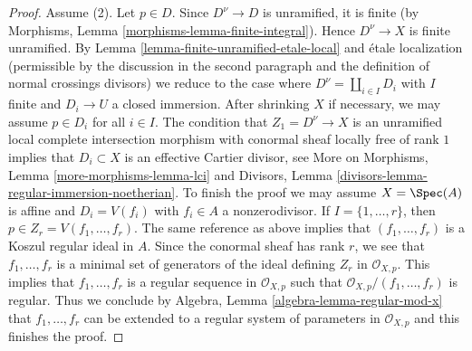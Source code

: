 \begin{proof}
\medskip\noindent
Assume (2). Let $p \in D$. Since $D^\nu \to D$ is unramified, it is
finite (by Morphisms, Lemma \ref{morphisms-lemma-finite-integral}).
Hence $D^\nu \to X$ is finite unramified.
By Lemma \ref{lemma-finite-unramified-etale-local}
and \'etale localization (permissible by the discussion
in the second paragraph and the definition of normal
crossings divisors) we reduce to the case where
$D^\nu = \coprod_{i \in I} D_i$
with $I$ finite and $D_i \to U$ a closed immersion.
After shrinking $X$ if necessary, we may assume
$p \in D_i$ for all $i \in I$. The condition that $Z_1 =  D^\nu \to X$ is an
unramified local complete intersection morphism
with conormal sheaf locally free of rank $1$
implies that $D_i \subset X$ is an effective Cartier divisor, see
More on Morphisms, Lemma \ref{more-morphisms-lemma-lci} and
Divisors, Lemma \ref{divisors-lemma-regular-immersion-noetherian}.
To finish the proof we may assume $X = \Spec(A)$ is affine
and $D_i = V(f_i)$ with $f_i \in A$ a nonzerodivisor.
If $I = \{1, \ldots, r\}$, then $p \in Z_r = V(f_1, \ldots, f_r)$.
The same reference as above implies that
$(f_1, \ldots, f_r)$ is a Koszul regular ideal in $A$.
Since the conormal sheaf has rank $r$, we see that
$f_1, \ldots, f_r$ is a minimal set of generators of
the ideal defining $Z_r$ in $\mathcal{O}_{X, p}$.
This implies that $f_1, \ldots, f_r$ is a regular sequence
in $\mathcal{O}_{X, p}$ such that $\mathcal{O}_{X, p}/(f_1, \ldots, f_r)$
is regular. Thus we conclude by
Algebra, Lemma \ref{algebra-lemma-regular-mod-x}
that $f_1, \ldots, f_r$ can be extended to a regular system of parameters
in $\mathcal{O}_{X, p}$ and this finishes the proof.
\end{proof}

